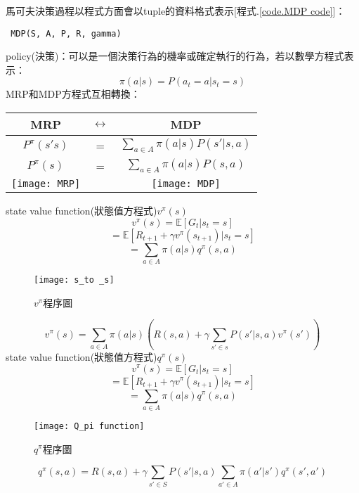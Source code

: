 馬可夫決策過程以程式方面會以tuple的資料格式表示[程式.\ref{code.MDP code}]：
\label{code.MDP code}
\begin{lstlisting}
 MDP(S, A, P, R, gamma)
\end{lstlisting}

policy(決策)：可以是一個決策行為的機率或確定執行的行為，若以數學方程式表示：
$$\pi (a|s) = P(a_t=a|s_t=s)$$
MRP和MDP方程式互相轉換：\\
\begin{center}
\begin{tabular}[c]{ccc}    
 MRP & $\longleftrightarrow$ & MDP\\
\hline
$P^{\pi}(s's)$ & = & $\sum_{a\in A}\pi (a|s)P(s'|s, a)$\\
$P^{\pi}(s)$ & = & $\sum_{a\in A}\pi (a|s)P(s, a)$\\
\texttt{[image: MRP]}&&\texttt{[image: MDP]}\\
\hline
\end{tabular}
\end{center}

state value function(狀態值方程式)$v^{\pi}(s)$\\
$$v^{\pi}(s) = \mathbb{E}[G_t|s_t=s]$$
$$= \mathbb{E}[R_{t+1}+\gamma v^{\pi}(s_{t+1})|s_t=s]$$
$$= \sum_{a\in A}\pi (a|s)q^{\pi}(s, a)$$
\begin{figure}[hbt!]
\begin{center}
\texttt{[image: s\_to \_s]}
\caption{$v^{\pi}$程序圖}
\label{fig.s_to_s}
\end{center}
\end{figure}
$$v^{\pi}(s) = \sum_{a\in A}\pi (a|s)(R(s, a)+\gamma \sum_{s'\in s}P(s'|s, a)v^{\pi}(s'))$$
state value function(狀態值方程式)$q^{\pi}(s)$
$$v^{\pi}(s) = \mathbb{E}[G_t|s_t=s]$$
$$= \mathbb{E}[R_{t+1}+\gamma v^{\pi}(s_{t+1})|s_t=s]$$
$$= \sum_{a\in A}\pi (a|s)q^{\pi}(s, a)$$
\begin{figure}[hbt!]
\begin{center}
\texttt{[image: Q\_pi function]}
\caption{$q^{\pi}$程序圖}
\label{fig.q_pi}
\end{center}
\end{figure}
$$q^\pi(s, a)=R(s, a)+\gamma\sum_{s'\in S}P(s'|s, a)\sum_{a'\in A}\pi(a'|s')q^{\pi}(s', a')$$
\newpage
